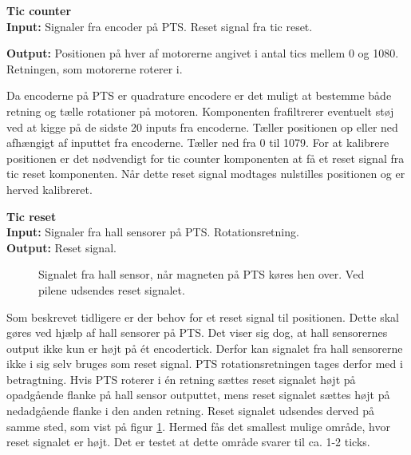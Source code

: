 
\textbf{Tic counter}\\
\textbf{Input:}
Signaler fra encoder på PTS. Reset signal fra tic reset.

\textbf{Output:} Positionen på hver af motorerne angivet i antal tics mellem 0 
og 1080. Retningen, som motorerne roterer i. 

Da encoderne på PTS er quadrature encodere er det muligt at bestemme både retning og 
tælle rotationer på motoren.
Komponenten frafiltrerer eventuelt støj ved at kigge på de sidste 20 inputs fra encoderne.
Tæller positionen op eller ned afhængigt af inputtet fra encoderne. 
Tæller ned fra 0 til 1079.
For at kalibrere positionen er det nødvendigt for tic counter komponenten at få 
et reset signal fra tic reset komponenten. 
Når dette reset signal modtages nulstilles positionen og er herved kalibreret.

\textbf{Tic reset}\\
\textbf{Input:} Signaler fra hall sensorer på PTS. Rotationsretning.\\
\textbf{Output:} Reset signal.

\begin{figure}[!th]
\centering

\caption[Signal fra hall sensor]{Signalet fra hall sensor, når magneten på PTS køres hen over. Ved pilene udsendes reset signalet.}
\label{fig:hall_sensor_signal}
\end{figure}

Som beskrevet tidligere er der behov for et reset signal til positionen. 
Dette skal gøres ved hjælp af hall sensorer på PTS. 
Det viser sig dog, at hall sensorernes output ikke kun er højt på ét encodertick. 
Derfor kan signalet fra hall sensorerne ikke i sig selv bruges som reset signal.
PTS rotationsretningen tages derfor med i betragtning.
Hvis PTS roterer i én retning sættes reset signalet højt på opadgående 
flanke på hall sensor outputtet, mens reset signalet sættes højt på nedadgående 
flanke i den anden retning. Reset signalet udsendes derved på samme sted, som vist på figur \ref{fig:hall_sensor_signal}.
Hermed fås det smallest mulige område, hvor reset signalet er højt.
Det er testet at dette område svarer til ca. 1-2 ticks.

